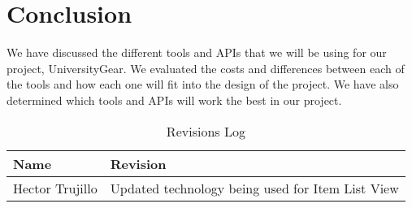 \documentclass[journal,compsoc, 10pt, draftclsnofoot, onecolumn]{IEEEtran}
\begin{document}
\section{Conclusion}
We have discussed the different tools and APIs that we will be using for our
project, UniversityGear. We evaluated the costs and differences between each 
of the tools and how each one will fit into the design of the project. We have also 
determined which tools and APIs will work the best in our project.

\newpage
\begin{table}[h]
\centering
\caption{Revisions Log}
\label{my-label}
\begin{tabularx}{\textwidth}{l|X}
\textbf{Name}  & \textbf{Revision} \\ \hline
 Hector Trujillo   &   Updated technology being used for Item List View \\ \hline
\end{tabularx}
\end{table}
\end{document}
